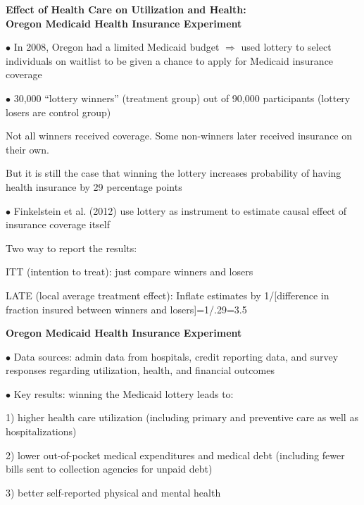 \documentclass[landscape]{slides}
\begin{document}
\begin{slide}
\begin{center}
{\bf Effect of Health Care on Utilization and Health: \\ Oregon Medicaid Health Insurance Experiment}
\end{center}

$\bullet$ In 2008, Oregon had a limited Medicaid budget $\Rightarrow$ used lottery to select individuals on waitlist to be given a chance to apply for Medicaid insurance coverage

$\bullet$ 30,000 ``lottery winners'' (treatment group) out of 90,000 participants (lottery losers are control group)

\small
Not all winners received coverage. Some non-winners later received insurance on their own.

But it is still the case that winning the lottery increases probability of having health insurance by 29 percentage
points

\normalsize
$\bullet$ Finkelstein et al. (2012) use lottery as instrument to estimate causal effect of insurance coverage itself

\small
Two way to report the results:

ITT (intention to treat): just compare winners and losers

LATE (local average treatment effect):
Inflate estimates by 1/[difference in fraction insured between winners and losers]=1/.29=3.5
\end{slide}


\begin{slide}
\begin{center}
{\bf Oregon Medicaid Health Insurance Experiment}
\end{center}

$\bullet$  Data sources: admin data from hospitals, credit reporting data, and survey responses regarding utilization, health, and financial outcomes

$\bullet$ Key results: winning the Medicaid lottery leads to:

1) higher health care utilization (including primary and preventive care as
well as hospitalizations)

2) lower out-of-pocket medical expenditures and medical
debt (including fewer bills sent to collection agencies for unpaid debt)

3) better self-reported physical and mental health


\end{slide}
\end{document}
